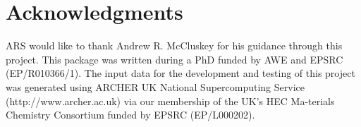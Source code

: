 \documentclass[journal=jacsat,manuscript=article]{achemso}
\begin{document}
\section{Acknowledgments}

ARS would like to thank Andrew R. McCluskey for his guidance through this project. This package was written during a PhD funded by AWE and EPSRC (EP/R010366/1). The input
data for the development and testing of this project was generated using ARCHER UK National Supercomputing Service (http://www.archer.ac.uk) via our membership of 
the UK's HEC Ma-terials Chemistry Consortium funded by EPSRC (EP/L000202).


\end{document}
